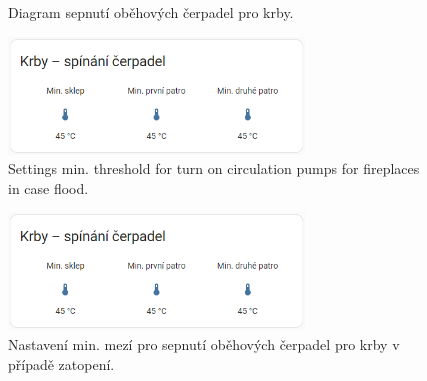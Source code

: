 \begin{Czech}
\begin{figure}[H]
    \centering
    \def\svgwidth{1\columnwidth}
    \graphicspath{{pictures/czech/software/svg/}}
    
    \caption[]{Diagram sepnutí oběhových čerpadel pro krby.}
    \label{fig:diagram-fireplace}
\end{figure}
\end{Czech}


\begin{English}
\begin{figure}[H]
    \centering
    \includegraphics[width=0.7\textwidth]{pictures/czech/software/fireplace-switching-pumps.png}
    \caption{Settings min. threshold for turn on circulation pumps for fireplaces in case flood.}
    \label{fig:fireplace-switching-pumps}
\end{figure}
\end{English}

\begin{Czech}
\begin{figure}[H]
    \centering
    \includegraphics[width=0.7\textwidth]{pictures/czech/software/fireplace-switching-pumps.png}
    \caption{Nastavení min. mezí pro sepnutí oběhových čerpadel pro krby v případě zatopení.}
    \label{fig:fireplace-switching-pumps}
\end{figure}
\end{Czech}


\begin{English}
\end{English}

